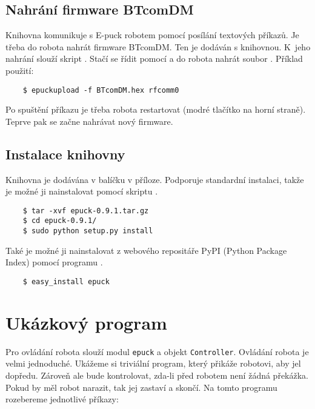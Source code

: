     \subsection{Nahrání firmware BTcomDM}

    Knihovna komunikuje s E-puck robotem pomocí posílání textových příkazů. Je
    třeba do robota nahrát firmware BTcomDM. Ten je dodáván s knihovnou.
    K~jeho nahrání slouží skript  \cite{epuckupload}. Stačí
    se řídit pomocí  a do robota nahrát soubor .
    Příklad použití:

    \begin{verbatim}
    $ epuckupload -f BTcomDM.hex rfcomm0
    \end{verbatim}

    Po spuštění příkazu je třeba robota restartovat (modré tlačítko na horní
    straně). Teprve pak se začne nahrávat nový firmware.

    \subsection{Instalace knihovny}

    Knihovna je dodávána v balíčku v příloze. Podporuje standardní instalaci,
    takže je možné ji nainstalovat pomocí skriptu .

    \begin{verbatim}
    $ tar -xvf epuck-0.9.1.tar.gz
    $ cd epuck-0.9.1/
    $ sudo python setup.py install
    \end{verbatim}

    Také je možné ji nainstalovat z webového repositáře PyPI (Python Package
    Index) \cite{pypi} pomocí programu .

    \begin{verbatim}
    $ easy_install epuck
    \end{verbatim}

\section{Ukázkový program}
\label{ukazkovy_program}

    Pro ovládání robota slouží modul {\tt epuck} a objekt {\tt Controller}.
    Ovládání robota je velmi jednoduché. Ukážeme si triviální program, který
    přikáže robotovi, aby jel dopředu. Zároveň ale bude kontrolovat, zda-li
    před robotem není žádná překážka. Pokud by měl robot narazit, tak jej
    zastaví a skončí. Na tomto programu rozebereme jednotlivé příkazy:


